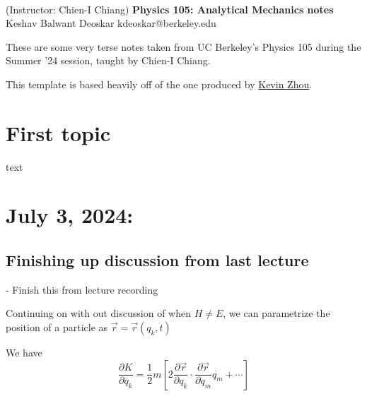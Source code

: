 \documentclass[11pt]{article}
\begin{document}
\thispagestyle{empty}
\bigskip \
\vspace{0.1cm}

\begin{center}
{\fontsize{22}{22} \selectfont (Instructor: Chien-I Chiang)}
\vskip 16pt
{\fontsize{36}{36} \selectfont \bf \sffamily Physics 105: Analytical Mechanics notes}
\vskip 24pt
{\fontsize{18}{18} \selectfont \rmfamily Keshav Balwant Deoskar} 
\vskip 6pt
{\fontsize{14}{14} \selectfont \ttfamily kdeoskar@berkeley.edu} 
\vskip 24pt
\end{center}



These are some very terse notes taken from UC Berkeley's Physics 105 during the Summer '24 session, taught by Chien-I Chiang.

\vskip 0.5cm
This template is based heavily off of the one produced by \href{https://knzhou.github.io/}{Kevin Zhou}.

\tableofcontents 


\newpage
\section{First topic}

\vskip 0.5cm
text


\newpage
\section{July 3, 2024:}

\subsection{Finishing up discussion from last lecture}
- Finish this from lecture recording

\vskip 0.5cm
Continuing on with out discussion of when $H \neq E$, we can parametrize the position of a particle as $\vec{r} = \vec{r}(q_k, t)$

We have 
\[ \frac{\partial K}{\partial \dot{q_{k}}} = \frac{1}{2}m \left[ 2 \frac{\partial \vec{r}}{\partial q_k} \cdot \frac{\partial \vec{r}}{\partial q_{m}} \dot{q_{m}} + \cdots \right] \]
\end{document}
